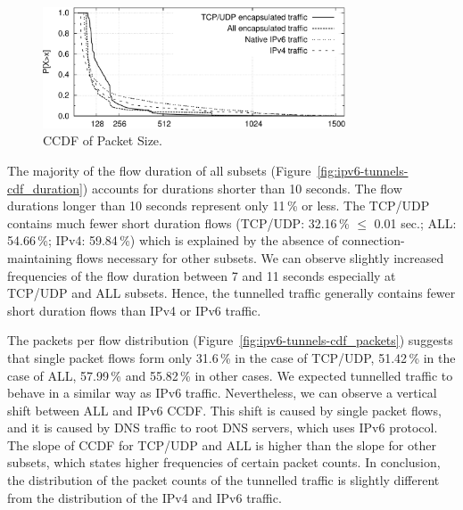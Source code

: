 \begin{figure}[!tb]
     \centering
     \includegraphics[width=0.8\textwidth]{figures/paper-tunnels/cdf_functions/cdf_bytes}
     \caption{CCDF of Packet Size.}
     \label{fig:ipv6-tunnels-cdf_bytes}
\end{figure}

The majority of the flow duration of all subsets (Figure~\ref{fig:ipv6-tunnels-cdf_duration}) accounts for durations shorter than 10 seconds. The flow durations longer than 10 seconds represent only 11\,\% or less. The TCP/UDP contains much fewer short duration flows (TCP/UDP: 32.16\,\% $\leq$ 0.01 sec.; ALL: 54.66\,\%; IPv4: 59.84\,\%) which is explained by the absence of connection-maintaining flows necessary for other subsets. We can observe slightly increased frequencies of the flow duration between 7 and 11 seconds especially at TCP/UDP and ALL subsets. Hence, the tunnelled traffic generally contains fewer short duration flows than IPv4 or IPv6 traffic.

The packets per flow distribution (Figure~\ref{fig:ipv6-tunnels-cdf_packets}) suggests that single packet flows form only 31.6\,\% in the case of TCP/UDP, 51.42\,\% in the case of ALL, 57.99\,\% and 55.82\,\% in other cases. We expected tunnelled traffic to behave in a similar way as IPv6 traffic. Nevertheless, we can observe a vertical shift between ALL and IPv6 CCDF. This shift is caused by single packet flows, and it is caused by DNS traffic to root DNS servers, which uses IPv6 protocol. The slope of CCDF for TCP/UDP and ALL is higher than the slope for other subsets, which states higher frequencies of certain packet counts. In conclusion, the distribution of the packet counts of the tunnelled traffic is slightly different from the distribution of the IPv4 and IPv6 traffic.

